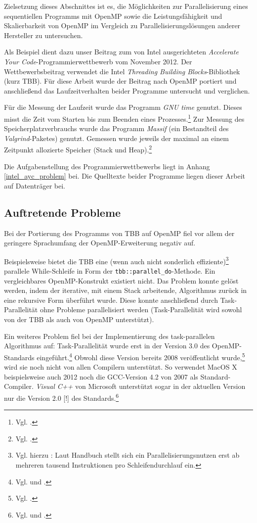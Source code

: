 \documentclass[11pt]{scrartcl}
\begin{document}
Zielsetzung dieses Abschnittes ist es, die Möglichkeiten zur Parallelisierung eines sequentiellen Programms mit OpenMP
sowie die Leistungsfähigkeit und Skalierbarkeit von OpenMP im Vergleich zu Parallelisierungslösungen anderer Hersteller
zu untersuchen.

Als Beispiel dient dazu unser Beitrag zum von Intel ausgerichteten \emph{Accelerate Your Code}-Programmierwettbewerb vom
November 2012. Der Wettbewerbsbeitrag verwendet die Intel \emph{Threading Building Blocks}-Bibliothek (kurz TBB). Für
diese Arbeit wurde der Beitrag nach OpenMP portiert und anschließend das Laufzeitverhalten beider Programme untersucht
und verglichen.

Für die Messung der Laufzeit wurde das Programm \emph{GNU time} genutzt. Dieses misst die Zeit vom Starten bis zum Beenden eines Prozesses.\footnote{Vgl. \cite{time_man_2012}.}
Zur Messung des Speicherplatzverbrauchs wurde das Programm \emph{Massif} (ein Bestandteil des \emph{Valgrind}-Paketes) genutzt. Gemessen wurde jeweils der maximal an einem Zeitpunkt allozierte Speicher (Stack und Heap).\footnote{Vgl. \cite[S. 136ff.]{valgrind_2012}.}

Die Aufgabenstellung des Programmierwettbewerbs liegt in Anhang \ref{intel_ayc_problem} bei. Die Quelltexte beider
Programme liegen dieser Arbeit auf Datenträger bei.

\subsection{Auftretende Probleme}

Bei der Portierung des Programms von TBB auf OpenMP fiel vor allem der geringere Sprachumfang der OpenMP-Erweiterung
negativ auf.

Beispielsweise bietet die TBB eine (wenn auch nicht sonderlich effiziente)\footnote{Vgl. hierzu \cite{intel_cook_2012}:
Laut Handbuch stellt sich ein Parallelisierungsnutzen erst ab mehreren tausend Instruktionen pro Schleifendurchlauf
ein.} parallele While-Schleife in Form der \texttt{tbb::parallel\_do}-Methode. Ein vergleichbares OpenMP-Konstrukt
existiert nicht. Das Problem konnte gelöst werden, indem der iterative, mit einem Stack arbeitende, Algorithmus zurück
in eine rekursive Form überführt wurde. Diese konnte anschließend durch Task-Parallelität ohne Probleme parallelisiert
werden (Task-Parallelität wird sowohl von der TBB als auch von OpenMP unterstützt).

Ein weiteres Problem fiel bei der Implementierung des task-parallelen Algorithmus auf: Task-Parallelität wurde erst in
der Version 3.0 des OpenMP-Standards eingeführt.\footnote{Vgl. \cite[S.~134]{openmp08} und
\cite[S.~406ff]{ayguade_design_2009}.} Obwohl diese Version bereits 2008 veröffentlicht wurde,\footnote{Vgl.
\cite{openmp.org_openmp_2012}.} wird sie noch nicht von allen Compilern unterstützt. So verwendet MacOS X
beispielsweise auch 2012 noch die GCC-Version 4.2 von 2007 als Standard-Compiler. \emph{Visual C++} von Microsoft
unterstützt sogar in der aktuellen Version nur die Version 2.0 [!] des Standards.\footnote{Vgl.
\cite{openmp.org_openmp_2012-2} und
\cite{microsoft_openmp_2012}.}
\end{document}
